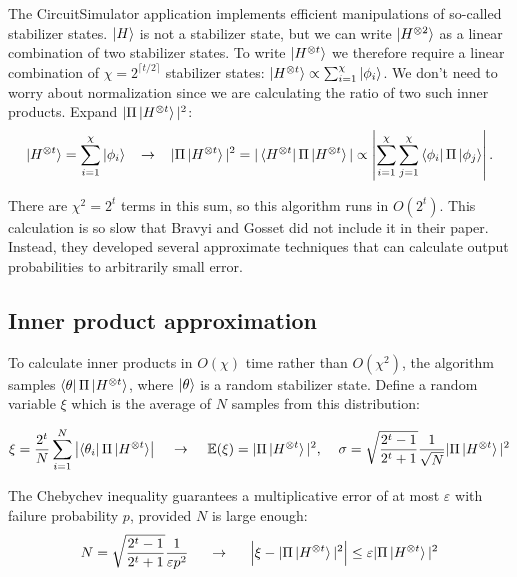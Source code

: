 \documentclass[11pt]{article}
\begin{document}
The CircuitSimulator application implements efficient manipulations of so-called stabilizer states. $\ket{H}$ is not a stabilizer state, but we can write $\ket{H^{\otimes 2}}$ as a linear combination of two stabilizer states. To write $\ket{H^{\otimes t}}$ we therefore require a linear combination of $\chi = 2^{\lceil t/2\rceil}$ stabilizer states: $\ket{H^{\otimes t}} \propto \sum_{i=1}^\chi \ket{\phi_i}$.  We don't need to worry about normalization since we are calculating the ratio of two such inner products. Expand $|\Pi\ket{H^{\otimes t}}|^2$:
$$\ket{H^{\otimes t}} = \sum^\chi_{i=1} \ket{\phi_i} \hspace{3mm} \to \hspace{3mm} |\Pi\ket{H^{\otimes t}}|^2 = |\bra{H^{\otimes t}}\Pi\ket{H^{\otimes t}}| \propto \left| \sum^\chi_{i=1} \sum^\chi_{j=1}\bra{\phi_i}\Pi\ket{\phi_j}\right|.\label{eq:decomp}$$

There are $\chi^2 = 2^t$ terms in this sum, so this algorithm runs in $O(2^t)$. This calculation is so slow that Bravyi and Gosset did not include it in their paper. Instead, they developed several approximate techniques that can calculate output probabilities to arbitrarily small error.


\subsection{Inner product approximation} \label{sec:ipa}

To calculate inner products in $O(\chi)$ time rather than $O(\chi^2)$, the algorithm samples $\bra{\theta}\Pi\ket{H^{\otimes t}}$, where $\ket{\theta}$ is a random stabilizer state. Define a random variable $\xi$ which is the average of $N$ samples from this distribution:

$$\xi = \frac{2^t}{N} \sum_{i=1}^N \left| \bra{\theta_i} \Pi \ket{H^{\otimes t}} \right|\hspace{4mm}\to\hspace{4mm} \mathbb{E}(\xi) = | \Pi \ket{H^{\otimes t}}|^2,\hspace{4mm} \sigma = \sqrt{\frac{2^t - 1}{2^t + 1}} \frac{1}{\sqrt{N}} | \Pi \ket{H^{\otimes t}}|^2 $$

\newcommand{\eps}{\varepsilon}
The Chebychev inequality guarantees a multiplicative error of at most $\eps$ with failure probability $p$, provided $N$ is large enough:
$$ N = \sqrt{\frac{2^t - 1}{2^t + 1}} \frac{1}{\eps p^2} \hspace{0.5cm}\to \hspace{0.5cm} \Big|\xi - |\Pi\ket{H^{\otimes t}}|^2 \Big| \leq \eps |\Pi\ket{H^{\otimes t}}|^2 $$
\end{document}
